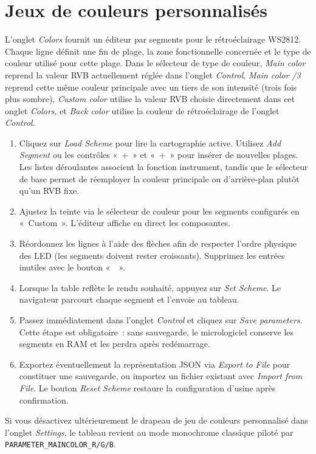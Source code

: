\section{Jeux de couleurs personnalisés}
L'onglet \emph{Colors} fournit un éditeur par segments pour le rétroéclairage WS2812. Chaque ligne définit une fin de plage, la zone fonctionnelle concernée et le type de couleur utilisé pour cette plage. Dans le sélecteur de type de couleur, \emph{Main color} reprend la valeur RVB actuellement réglée dans l'onglet \emph{Control}, \emph{Main color /3} reprend cette même couleur principale avec un tiers de son intensité (trois fois plus sombre), \emph{Custom color} utilise la valeur RVB choisie directement dans cet onglet \emph{Colors}, et \emph{Back color} utilise la couleur de rétroéclairage de l'onglet \emph{Control}.

\begin{enumerate}
    \item Cliquez sur \emph{Load Scheme} pour lire la cartographie active. Utilisez \emph{Add Segment} ou les contrôles «~+\textuparrow{}~» et «~+\textdownarrow{}~» pour insérer de nouvelles plages. Les listes déroulantes associent la fonction instrument, tandis que le sélecteur de base permet de réemployer la couleur principale ou d'arrière-plan plutôt qu'un RVB fixe.
    \item Ajustez la teinte via le sélecteur de couleur pour les segments configurés en «~Custom~». L'éditeur affiche en direct les composantes.
    \item Réordonnez les lignes à l'aide des flèches afin de respecter l'ordre physique des LED (les segments doivent rester croissants). Supprimez les entrées inutiles avec le bouton «~\texttimes{}~».
    \item Lorsque la table reflète le rendu souhaité, appuyez sur \emph{Set Scheme}. Le navigateur parcourt chaque segment et l'envoie au tableau.
    \item Passez immédiatement dans l'onglet \emph{Control} et cliquez sur \emph{Save parameters}. Cette étape est obligatoire~: sans sauvegarde, le micrologiciel conserve les segments en RAM et les perdra après redémarrage.
    \item Exportez éventuellement la représentation JSON via \emph{Export to File} pour constituer une sauvegarde, ou importez un fichier existant avec \emph{Import from File}. Le bouton \emph{Reset Scheme} restaure la configuration d'usine après confirmation.
\end{enumerate}

Si vous désactivez ultérieurement le drapeau de jeu de couleurs personnalisé dans l'onglet \emph{Settings}, le tableau revient au mode monochrome classique piloté par \verb|PARAMETER_MAINCOLOR_R/G/B|.
